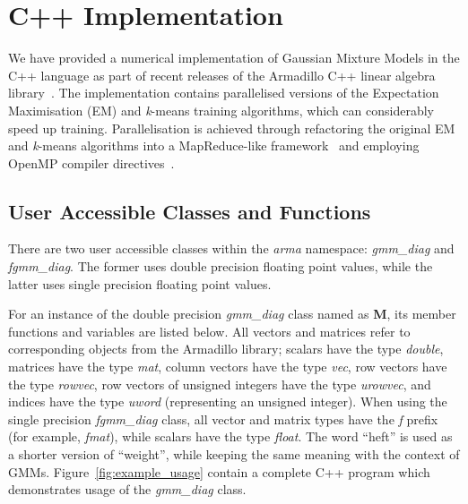 \section{C++ Implementation}

We have provided a numerical implementation of Gaussian Mixture Models in the C++ language
as part of recent releases of the Armadillo C++ linear algebra library~\cite{Armadillo_JOSS_2016}.
The implementation contains parallelised versions of the Expectation Maximisation (EM) and {\it k}-means training algorithms,
which can considerably speed up training.
Parallelisation is achieved through refactoring the original EM and {\it k}-means algorithms
into a MapReduce-like framework~\cite{MapReduce_2004} and employing OpenMP compiler directives~\cite{OpenMP_2007}.


\subsection{User Accessible Classes and Functions}

There are two user accessible classes within the {\it arma} namespace:
{\it gmm\_diag} and {\it fgmm\_diag}.
The former uses double precision floating point values, while the latter uses single precision floating point values.

For an instance of the double precision {\it gmm\_diag} class named as {\bf M},
its member functions and variables are listed below.
All vectors and matrices refer to corresponding objects from the Armadillo library;
scalars have the type {\it double},
matrices have the type {\it mat},
column vectors have the type {\it vec},
row vectors have the type {\it rowvec},
row vectors of unsigned integers have the type {\it urowvec},
and indices have the type {\it uword} (representing an unsigned integer).
When using the single precision {\it fgmm\_diag} class,
all vector and matrix types have the {\it f} prefix (for example, {\it fmat}),
while scalars have the type {\it float}.
The word ``heft'' is used as a shorter version of ``weight'', while keeping the same meaning with the context of GMMs.
Figure~\ref{fig:example_usage} contain a complete C++ program which demonstrates usage of the {\it gmm\_diag} class.

